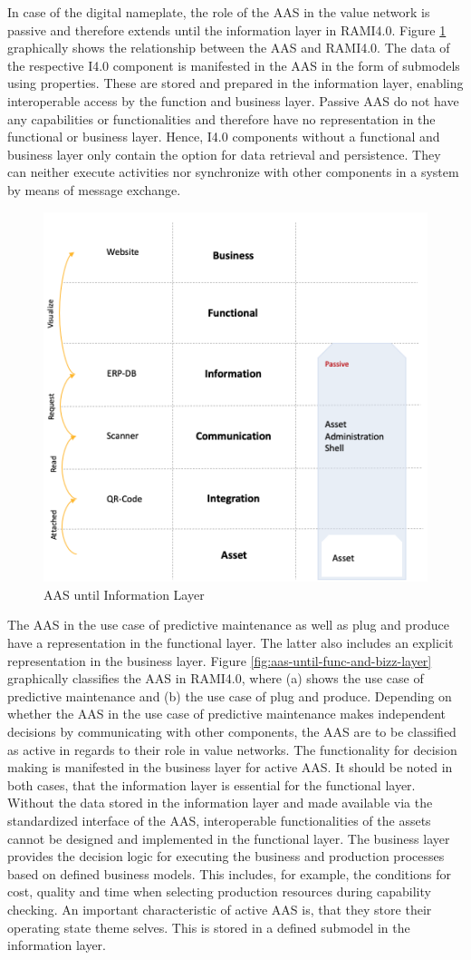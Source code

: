 In case of the digital nameplate, the role of the \ac{AAS} in the value network is passive and therefore extends until the information layer in \ac{RAMI4.0}. Figure \ref{fig:aas-until-info-layer} graphically shows the relationship between the \ac{AAS} and \ac{RAMI4.0}. The data of the respective \ac{I4.0} component is manifested in the \ac{AAS} in the form of submodels using properties. These are stored and prepared in the information layer, enabling interoperable access by the function and business layer. Passive \ac{AAS} do not have any capabilities or functionalities and therefore have no representation in the functional or business layer. Hence, \ac{I4.0} components without a functional and business layer only contain the option for data retrieval and persistence. They can neither execute activities nor synchronize with other components in a system by means of message exchange.
\begin{figure}[h]
\centering
\includegraphics[width=.45\textwidth]{content/pictures/aas_rami_v1.png}
\caption{\ac{AAS} until Information Layer}
\label{fig:aas-until-info-layer}
\end{figure}

The \ac{AAS} in the use case of predictive maintenance as well as plug and produce have a representation in the functional layer. The latter also includes an explicit representation in the business layer. Figure \ref{fig:aas-until-func-and-bizz-layer} graphically classifies the \ac{AAS} in \ac{RAMI4.0}, where (a) shows the use case of predictive maintenance and (b) the use case of plug and produce. Depending on whether the \ac{AAS} in the use case of predictive maintenance makes independent decisions by communicating with other components, the \ac{AAS} are to be classified as active in regards to their role in value networks. The functionality for decision making is manifested in the business layer for active \ac{AAS}. It should be noted in both cases, that the information layer is essential for the functional layer. Without the data stored in the information layer and made available via the standardized interface of the \ac{AAS}, interoperable functionalities of the assets cannot be designed and implemented in the functional layer. The business layer provides the decision logic for executing the business and production processes based on defined business models. This includes, for example, the conditions for cost, quality and time when selecting production resources during capability checking. An important characteristic of active \ac{AAS} is, that they store their operating state theme selves. This is stored in a defined submodel in the information layer.

